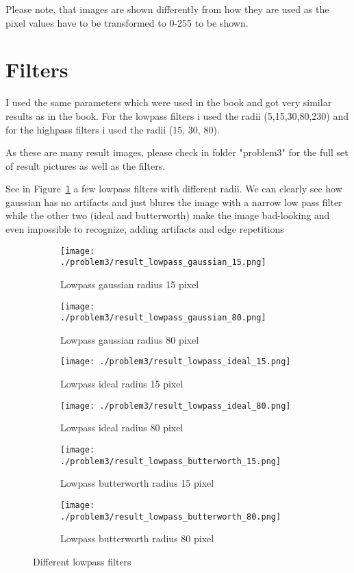 \documentclass[a4paper]{scrartcl}
\begin{document}
Please note, that images are shown differently from how they are used as the pixel values have to be transformed to 0-255 to be shown.


\section{Filters}

I used the same parameters which were used in the book and got very similar results as in the book.
For the lowpass filters i used the radii (5,15,30,80,230) and for the highpass filters i used the radii (15, 30, 80).

As these are many result images, please check in folder "problem3" for the full set of result pictures as well as the filters.

See in Figure~\ref{fig:lowpassfilters} a few lowpass filters with different radii. We can clearly see how gaussian has no artifacts and just blures the image with a narrow low pass filter while the other two (ideal and butterworth) make the image bad-looking and even impossible to recognize, adding artifacts and edge repetitions

\begin{figure}[h]
    \centering
    \begin{subfigure}[t]{0.4\textwidth}
      \texttt{[image: ./problem3/result\_lowpass\_gaussian\_15.png]}
        \caption{Lowpass gaussian radius 15 pixel}
    \end{subfigure}
    \begin{subfigure}[t]{0.4\textwidth}
      \texttt{[image: ./problem3/result\_lowpass\_gaussian\_80.png]}
        \caption{Lowpass gaussian radius 80 pixel}
    \end{subfigure}
    \begin{subfigure}[t]{0.4\textwidth}
      \texttt{[image: ./problem3/result\_lowpass\_ideal\_15.png]}
        \caption{Lowpass ideal radius 15 pixel}
    \end{subfigure}
    \begin{subfigure}[t]{0.4\textwidth}
      \texttt{[image: ./problem3/result\_lowpass\_ideal\_80.png]}
        \caption{Lowpass ideal radius 80 pixel}
    \end{subfigure}
    \begin{subfigure}[t]{0.4\textwidth}
      \texttt{[image: ./problem3/result\_lowpass\_butterworth\_15.png]}
        \caption{Lowpass butterworth radius 15 pixel}
    \end{subfigure}
    \begin{subfigure}[t]{0.4\textwidth}
      \texttt{[image: ./problem3/result\_lowpass\_butterworth\_80.png]}
        \caption{Lowpass butterworth radius 80 pixel}
    \end{subfigure}

    \caption{Different lowpass filters}
    \label{fig:lowpassfilters}
\end{figure}
\end{document}
